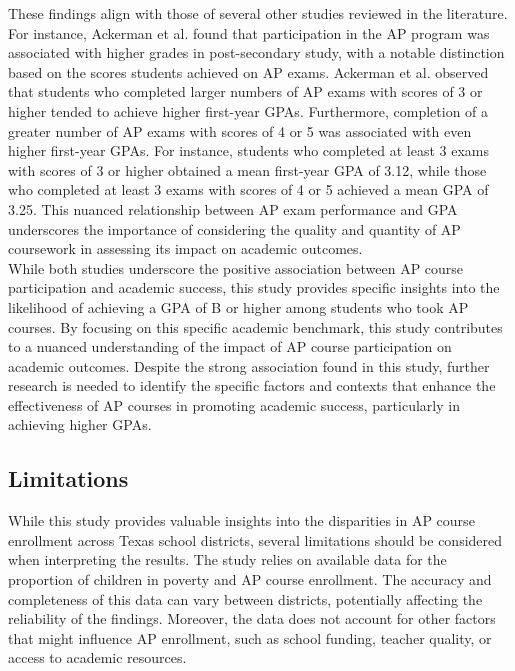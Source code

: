 \documentclass[sn-mathphys-num]{sn-jnl}%
\theoremstyle{thmstyleone}%
\theoremstyle{thmstyletwo}%
\theoremstyle{thmstylethree}%
\begin{document}
{These findings align with those of several other studies reviewed in the literature. For instance, Ackerman et al. found that participation in the AP program was associated with higher grades in post-secondary study, with a notable distinction based on the scores students achieved on AP exams. Ackerman et al. observed that students who completed larger numbers of AP exams with scores of 3 or higher tended to achieve higher first-year GPAs. Furthermore, completion of a greater number of AP exams with scores of 4 or 5 was associated with even higher first-year GPAs. For instance, students who completed at least 3 exams with scores of 3 or higher obtained a mean first-year GPA of 3.12, while those who completed at least 3 exams with scores of 4 or 5 achieved a mean GPA of 3.25. This nuanced relationship between AP exam performance and GPA underscores the importance of considering the quality and quantity of AP coursework in assessing its impact on academic outcomes.\\

While both studies underscore the positive association between AP course participation and academic success, this study provides specific insights into the likelihood of achieving a GPA of B or higher among students who took AP courses. By focusing on this specific academic benchmark, this study contributes to a nuanced understanding of the impact of AP course participation on academic outcomes. Despite the strong association found in this study, further research is needed to identify the specific factors and contexts that enhance the effectiveness of AP courses in promoting academic success, particularly in achieving higher GPAs.\\

\subsection{Limitations}

While this study provides valuable insights into the disparities in AP course enrollment across Texas school districts, several limitations should be considered when interpreting the results. The study relies on available data for the proportion of children in poverty and AP course enrollment. The accuracy and completeness of this data can vary between districts, potentially affecting the reliability of the findings. Moreover, the data does not account for other factors that might influence AP enrollment, such as school funding, teacher quality, or access to academic resources.\\

}
\end{document}
